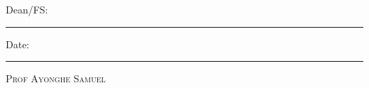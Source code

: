 \documentclass[11pt, oneside]{Thesis} %
\begin{document}
{\begin{minipage}{0.5\textwidth}
\begin{flushleft} 
Dean/FS:\\
\Large \rule[1em]{10em}{2.0pt} %
\end{flushleft}
\end{minipage}
\begin{minipage}{0.5\textwidth}
\begin{flushleft} \Large
\hspace{30} Date:\\
\hspace{30} \rule[1em]{10em}{2.0pt} %
\end{flushleft}
\end{minipage}
\large \textsc{Prof Ayonghe Samuel}

}

\clearpage %
\end{document}
